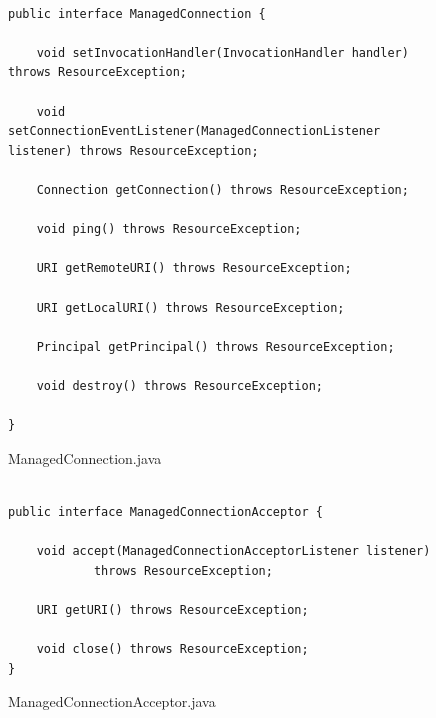 \begin{figure}[!tbp]
\centering
\lstset{language=Java, stepnumber=1, showspaces=false, showstringspaces=false,breaklines=true}
\begin{lstlisting}

public interface ManagedConnection {

    void setInvocationHandler(InvocationHandler handler) throws ResourceException;

    void setConnectionEventListener(ManagedConnectionListener listener) throws ResourceException;

    Connection getConnection() throws ResourceException;

    void ping() throws ResourceException;

    URI getRemoteURI() throws ResourceException;

    URI getLocalURI() throws ResourceException;

    Principal getPrincipal() throws ResourceException;

    void destroy() throws ResourceException;

}
\end{lstlisting}
\caption{ManagedConnection.java}
\label{}
\end{figure}

\begin{figure}[!tbp]
\centering
\lstset{language=Java, stepnumber=1, showspaces=false, showstringspaces=false,breaklines=true}
\begin{lstlisting}

public interface ManagedConnectionAcceptor {

    void accept(ManagedConnectionAcceptorListener listener)
            throws ResourceException;

    URI getURI() throws ResourceException;
    
    void close() throws ResourceException;
}
\end{lstlisting}
\caption{ManagedConnectionAcceptor.java}
\label{}
\end{figure}


